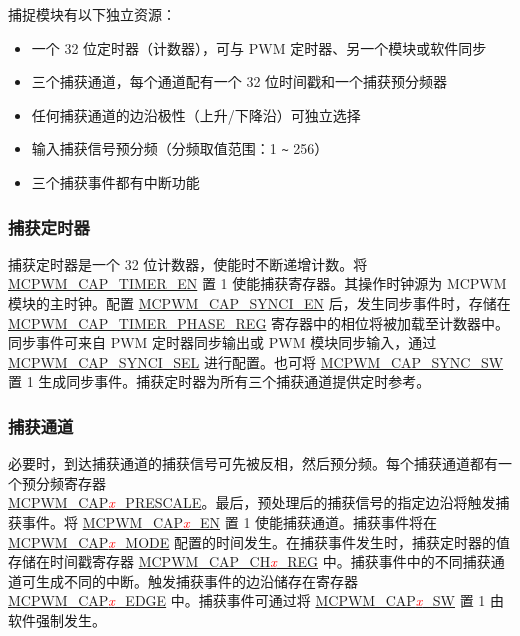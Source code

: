 \documentclass[main\_\_CN.tex]{subfiles}
\begin{document}
捕捉模块有以下独立资源：
\begin{itemize}
    \item  一个 32 位定时器（计数器），可与 PWM 定时器、另一个模块或软件同步
    \item 三个捕获通道，每个通道配有一个 32 位时间戳和一个捕获预分频器
    \item 任何捕获通道的边沿极性（上升/下降沿）可独立选择
    \item 输入捕获信号预分频（分频取值范围：1 \verb+~+ 256）
    \item 三个捕获事件都有中断功能
\end{itemize}

\subsubsection{捕获定时器}
 捕获定时器是一个 32 位计数器，使能时不断递增计数。将 \hyperref[fielddesc:MCPWMCAPTIMEREN]{MCPWM\_CAP\_TIMER\_EN} 置 1 使能捕获寄存器。其操作时钟源为 MCPWM模块的主时钟。配置 \hyperref[fielddesc:MCPWMCAPSYNCIEN]{MCPWM\_CAP\_SYNCI\_EN} 后，发生同步事件时，存储在\\ \hyperref[regdesc:MCPWMCAPTIMERPHASEREG]{MCPWM\_CAP\_TIMER\_PHASE\_REG} 寄存器中的相位将被加载至计数器中。同步事件可来自 PWM 定时器同步输出或 PWM 模块同步输入，通过 \hyperref[fielddesc:MCPWMCAPSYNCISEL]{MCPWM\_CAP\_SYNCI\_SEL} 进行配置。也可将 \hyperref[fielddesc:MCPWMCAPSYNCSW]{MCPWM\_CAP\_SYNC\_SW} 置 1 生成同步事件。捕获定时器为所有三个捕获通道提供定时参考。

\subsubsection{捕获通道}

必要时，到达捕获通道的捕获信号可先被反相，然后预分频。每个捕获通道都有一个预分频寄存器 \\\hyperref[fielddesc:MCPWMCAP0PRESCALE]{MCPWM\_CAP\textcolor{red}{\it{x}}\_PRESCALE}。最后，预处理后的捕获信号的指定边沿将触发捕获事件。将 \hyperref[fielddesc:MCPWMCAP0EN]{MCPWM\_CAP\textcolor{red}{\it{x}}\_EN} 置 1 使能捕获通道。捕获事件将在 \hyperref[fielddesc:MCPWMCAP0MODE]{MCPWM\_CAP\textcolor{red}{\it{x}}\_MODE} 配置的时间发生。在捕获事件发生时，捕获定时器的值存储在时间戳寄存器 \hyperref[regdesc:MCPWMCAPCH0REG]{MCPWM\_CAP\_CH\textcolor{red}{\it{x}}\_REG} 中。捕获事件中的不同捕获通道可生成不同的中断。触发捕获事件的边沿储存在寄存器 \hyperref[fielddesc:MCPWMCAP0EDGE]{MCPWM\_CAP\textcolor{red}{\it{x}}\_EDGE} 中。捕获事件可通过将 \hyperref[fielddesc:MCPWMCAP0SW]{MCPWM\_CAP\textcolor{red}{\it{x}}\_SW} 置 1 由软件强制发生。
\end{document}
